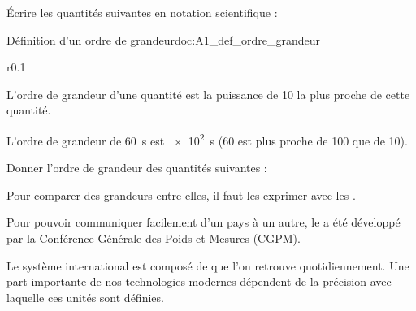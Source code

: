 \numeroQuestion Écrire les quantités suivantes en notation scientifique :
  



\begin{doc}{Définition d'un ordre de grandeur}{doc:A1_def_ordre_grandeur}
  \begin{wrapfigure}[3]{r}{0.1\linewidth}
    \vspace*{-32pt}
  \end{wrapfigure}

  \vAligne{-36pt}
  \begin{importants}
    L'ordre de grandeur d'une quantité est la puissance de 10 la plus proche de cette quantité.
  \end{importants}
  \exemple L'ordre de grandeur de \qty{60}{\s} est \qty{e2}{\s} (60 est plus proche de 100 que de 10). 
\end{doc}


\newpage
\vspace*{-28pt}
\numeroQuestion Donner l'ordre de grandeur des quantités suivantes :




\vspace*{-12pt}

Pour comparer des grandeurs entre elles, il faut les exprimer avec les . %

Pour pouvoir communiquer facilement d'un pays à un autre, le  a été développé par la Conférence Générale des Poids et Mesures (CGPM). %

Le système international est composé de  que l'on retrouve quotidiennement. Une part importante de nos technologies modernes dépendent de la précision avec laquelle ces unités sont définies.


